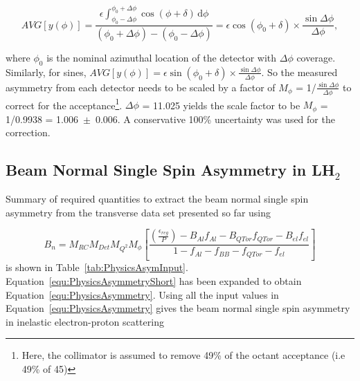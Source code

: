\begin{equation} \label{equ:eqDetectorNonlinearity}
AVG[y(\phi)] = \frac{ \epsilon\int_{\phi_{0}-\Delta\phi}^{\phi_{0}+\Delta\phi} \cos(\phi+\delta)\,\mathrm{d}\phi }{(\phi_{0}+\Delta\phi)-(\phi_{0}-\Delta\phi)} = \epsilon\cos (\phi_{0} + \delta) \times \frac{\sin\Delta\phi}{\Delta\phi}, 
\end{equation}

\noindent
where $\phi_{0}$ is the nominal azimuthal location of the detector with $\Delta\phi$ coverage. Similarly, for sines, $AVG[y(\phi)] = \epsilon\sin (\phi_{0} + \delta) \times \frac{\sin\Delta\phi}{\Delta\phi}$. So the measured asymmetry from each detector needs to be scaled by a factor of $M_{\phi}$ = 1/$\frac{\sin\Delta\phi}{\Delta\phi}$ to correct for the acceptance\footnote{Here, the collimator is assumed to remove 49\% of the octant acceptance (i.e 49\% of 45\degrees{})}. $\Delta\phi$ = 11.025\degrees{} yields the scale factor to be $M_{\phi}$ = 1/0.9938 = 1.006~$\pm$~0.006.
A conservative 100\% uncertainty was used for the correction.

\subsection{Beam Normal Single Spin Asymmetry in LH$_{2}$}
Summary of required quantities to extract the beam normal single spin asymmetry from the transverse data set presented so far using

\begin{equation} \label{equ:PhysicsAsymmetry}
B_{n} = M_{RC}M_{Det}M_{Q^{2}}M_{\phi} \left[ \frac{\left(\frac{\epsilon_{reg}}{P}\right) - B_{Al}f_{Al} - B_{QTor}f_{QTor} - B_{el}f_{el} }{1 - f_{Al} - f_{BB} - f_{QTor} - f_{el}} \right] 
\end{equation}
is shown in Table~\ref{tab:PhysicsAsymInput}. Equation~\ref{equ:PhysicsAsymmetryShort} has been expanded to obtain Equation~\ref{equ:PhysicsAsymmetry}. 
Using all the input values in Equation~\ref{equ:PhysicsAsymmetry} gives the beam normal single spin asymmetry in inelastic electron-proton scattering

